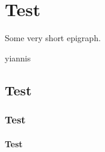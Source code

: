 \documentclass{book}
\begin{document}
\tableofcontents
\mainmatter

\chapter{Test}
\expandafter\epigraph{Some very short epigraph.}{yiannis}
\lipsum
\section{Test}
\lipsum
\subsection{Test}
\lipsum
\subsubsection{Test}
\lipsum
\end{document}
